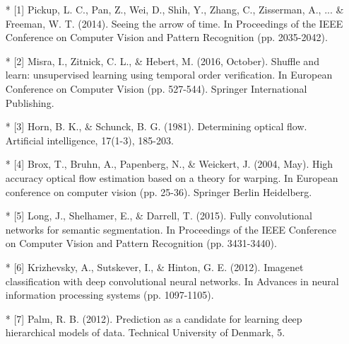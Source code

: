 \documentclass[10pt,a4paper]{report}
\begin{document}
		\scriptsize{
		\begin{itemize}
			
			\item[*] [1] Pickup, L. C., Pan, Z., Wei, D., Shih, Y., Zhang, C., Zisserman, A., ... \& Freeman, W. T. (2014). Seeing the arrow of time. In Proceedings of the IEEE Conference on Computer Vision and Pattern Recognition (pp. 2035-2042).
			
			\item[*] [2] Misra, I., Zitnick, C. L., \& Hebert, M. (2016, October). Shuffle and learn: unsupervised learning using temporal order verification. In European Conference on Computer Vision (pp. 527-544). Springer International Publishing.
			
			\item[*] [3] Horn, B. K., \& Schunck, B. G. (1981). Determining optical flow. Artificial intelligence, 17(1-3), 185-203.
			
			\item[*] [4] Brox, T., Bruhn, A., Papenberg, N., \& Weickert, J. (2004, May). High accuracy optical flow estimation based on a theory for warping. In European conference on computer vision (pp. 25-36). Springer Berlin Heidelberg.
			
			\item[*] [5] Long, J., Shelhamer, E., \& Darrell, T. (2015). Fully convolutional networks for semantic segmentation. In Proceedings of the IEEE Conference on Computer Vision and Pattern Recognition (pp. 3431-3440).
			
			\item[*] [6] Krizhevsky, A., Sutskever, I., \& Hinton, G. E. (2012). Imagenet classification with deep convolutional neural networks. In Advances in neural information processing systems (pp. 1097-1105).
			
			\item[*] [7] Palm, R. B. (2012). Prediction as a candidate for learning deep hierarchical models of data. Technical University of Denmark, 5.
			
		\end{itemize}
	}
	
\end{document}
